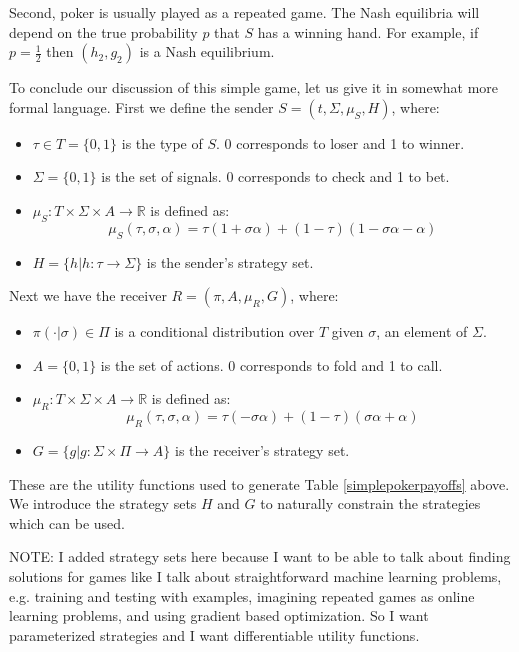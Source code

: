 \documentclass{article}
\begin{document}
Second, poker is usually played as a repeated game. The Nash equilibria will depend on the true probability $p$ that $S$ has a winning hand. For example, if $p = \frac{1}{2}$ then $(h_2, g_2)$ is a Nash equilibrium.

To conclude our discussion of this simple game, let us give it in somewhat more formal language. First we define the sender $S = (t, \Sigma, \mu_S, H)$, where:
\begin{itemize}
	\item $\tau \in T = \lbrace 0, 1 \rbrace$ is the type of $S$. 0 corresponds to loser and 1 to winner.
	\item $\Sigma = \lbrace 0, 1 \rbrace$ is the set of signals. 0 corresponds to check and 1 to bet.
	\item $\mu_S: T \times \Sigma \times A \longrightarrow \mathbb{R}$ is defined as:
		\begin{equation}
\mu_S(\tau, \sigma, \alpha) = \tau(1+\sigma\alpha) + (1-\tau)(1-\sigma\alpha-\alpha)
		\end{equation}
	\item $H = \lbrace h | h: \tau \rightarrow \Sigma \rbrace$ is the sender's strategy set.
\end{itemize}

\noindent Next we have the receiver $R = (\pi, A, \mu_R, G)$, where:
\begin{itemize}
	\item $\pi(\cdot|\sigma) \in \Pi$ is a conditional distribution over $T$ given $\sigma$, an element of $\Sigma$.
	\item $A = \lbrace 0, 1 \rbrace$ is the set of actions. 0 corresponds to fold and 1 to call.
	\item $\mu_R: T \times \Sigma \times A \longrightarrow \mathbb{R}$ is defined as:
		\begin{equation}
\mu_R(\tau, \sigma, \alpha) = \tau(-\sigma\alpha) + (1-\tau)(\sigma\alpha+\alpha)
		\end{equation}
	\item $G = \lbrace g | g: \Sigma \times \Pi \rightarrow A \rbrace$ is the receiver's strategy set.
\end{itemize}

\noindent These are the utility functions used to generate Table \ref{simplepokerpayoffs} above. We introduce the strategy sets $H$ and $G$ to naturally constrain the strategies which can be used.

NOTE: I added strategy sets here because I want to be able to talk about finding solutions for games like I talk about straightforward machine learning problems, e.g. training and testing with examples, imagining repeated games as online learning problems, and using gradient based optimization. So I want parameterized strategies and I want differentiable utility functions.
\end{document}

